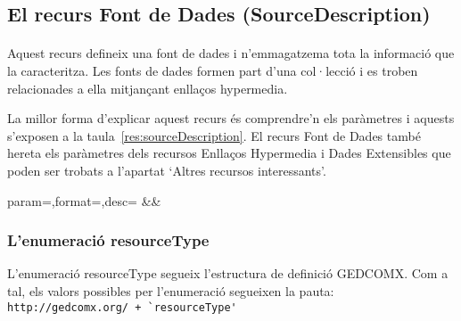 \subsection{El recurs Font de Dades (SourceDescription)}

    \paragraph{}
    Aquest recurs defineix una font de dades i n'emmagatzema tota la informació que la caracteritza. Les fonts de dades formen part d'una col·lecció i es troben relacionades a ella mitjançant enllaços hypermedia.

    La millor forma d'explicar aquest recurs és comprendre'n els paràmetres i aquests s'exposen a la taula~\ref{res:sourceDescription}. El recurs Font de Dades també hereta els paràmetres dels recursos Enllaços Hypermedia i Dades Extensibles que poden ser trobats a l'apartat `Altres recursos interessants'.

    \begin{center}
             {param=\param,format=\format,desc=\desc}
             {\param&\format&\desc}
     \end{center}


    \subsubsection{L'enumeració resourceType}

    L'enumeració resourceType segueix l'estructura de definició GEDCOMX. Com a tal, els valors possibles per l'enumeració segueixen la pauta:\\\verb|http://gedcomx.org/ + `resourceType'|

